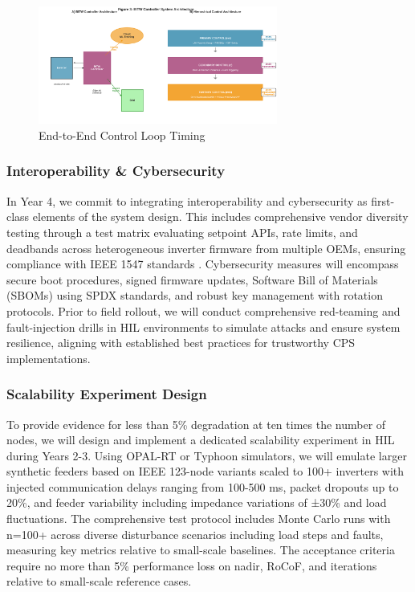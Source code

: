 \documentclass[12pt]{article}
\begin{document}
\begin{figure}[H]
\centering
\includegraphics[width=0.7\textwidth]{figure3_system_architecture.pdf}
\caption{End-to-End Control Loop Timing}
\end{figure}

\subsubsection{Interoperability \& Cybersecurity}

In Year 4, we commit to integrating interoperability and cybersecurity as first-class elements of the system design. This includes comprehensive vendor diversity testing through a test matrix evaluating setpoint APIs, rate limits, and deadbands across heterogeneous inverter firmware from multiple OEMs, ensuring compliance with IEEE 1547 standards \cite{ieee1547}. Cybersecurity measures will encompass secure boot procedures, signed firmware updates, Software Bill of Materials (SBOMs) using SPDX standards, and robust key management with rotation protocols. Prior to field rollout, we will conduct comprehensive red-teaming and fault-injection drills in HIL environments to simulate attacks and ensure system resilience, aligning with established best practices for trustworthy CPS implementations.

\subsubsection{Scalability Experiment Design}

To provide evidence for less than 5\% degradation at ten times the number of nodes, we will design and implement a dedicated scalability experiment in HIL during Years 2-3. Using OPAL-RT or Typhoon simulators, we will emulate larger synthetic feeders based on IEEE 123-node variants scaled to 100+ inverters with injected communication delays ranging from 100-500 ms, packet dropouts up to 20\%, and feeder variability including impedance variations of ±30\% and load fluctuations. The comprehensive test protocol includes Monte Carlo runs with n=100+ across diverse disturbance scenarios including load steps and faults, measuring key metrics relative to small-scale baselines. The acceptance criteria require no more than 5\% performance loss on nadir, RoCoF, and iterations relative to small-scale reference cases.
\end{document}
